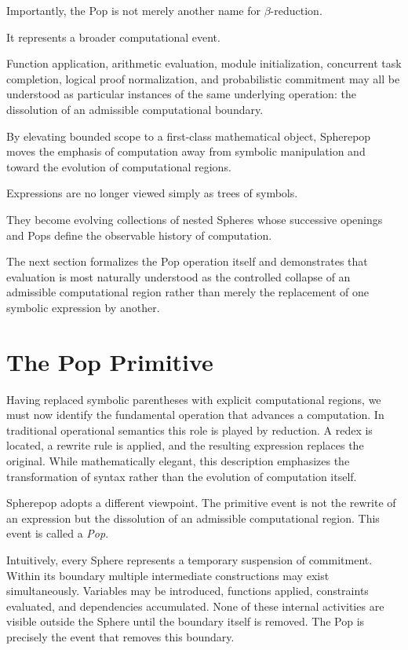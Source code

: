 \documentclass[12pt,oneside]{article}
\theoremstyle{definition}
\theoremstyle{remark}
\begin{document}
Importantly, the Pop is not merely another name for $\beta$-reduction.

It represents a broader computational event.

Function application, arithmetic evaluation, module initialization, concurrent
task completion, logical proof normalization, and probabilistic commitment may
all be understood as particular instances of the same underlying operation:
the dissolution of an admissible computational boundary.

By elevating bounded scope to a first-class mathematical object, Spherepop
moves the emphasis of computation away from symbolic manipulation and toward
the evolution of computational regions.

Expressions are no longer viewed simply as trees of symbols.

They become evolving collections of nested Spheres whose successive openings
and Pops define the observable history of computation.

The next section formalizes the Pop operation itself and demonstrates that
evaluation is most naturally understood as the controlled collapse of an
admissible computational region rather than merely the replacement of one
symbolic expression by another.

\section{The Pop Primitive}

Having replaced symbolic parentheses with explicit computational regions, we
must now identify the fundamental operation that advances a computation. In
traditional operational semantics this role is played by reduction. A redex is
located, a rewrite rule is applied, and the resulting expression replaces the
original. While mathematically elegant, this description emphasizes the
transformation of syntax rather than the evolution of computation itself.

Spherepop adopts a different viewpoint. The primitive event is not the rewrite
of an expression but the dissolution of an admissible computational region.
This event is called a \emph{Pop}.

Intuitively, every Sphere represents a temporary suspension of commitment.
Within its boundary multiple intermediate constructions may exist
simultaneously. Variables may be introduced, functions applied, constraints
evaluated, and dependencies accumulated. None of these internal activities are
visible outside the Sphere until the boundary itself is removed. The Pop is
precisely the event that removes this boundary.
\end{document}
